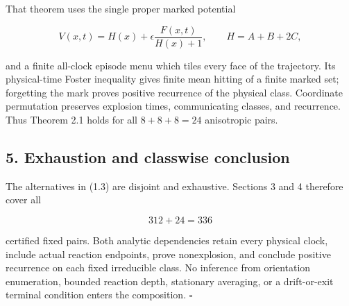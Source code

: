 That theorem uses the single proper marked potential

\[
 V(x,t)=H(x)+\epsilon\frac{F(x,t)}{H(x)+1},
 \qquad H=A+B+2C,                                     \tag{4.3}
\]

and a finite all-clock episode menu which tiles every face of the
trajectory. Its physical-time Foster inequality gives finite mean
hitting of a finite marked set; forgetting the mark proves positive
recurrence of the physical class. Coordinate permutation preserves
explosion times, communicating classes, and recurrence. Thus Theorem 2.1
holds for all \(8+8+8=24\) anisotropic pairs.

\subsection{5. Exhaustion and classwise
conclusion}

The alternatives in (1.3) are disjoint and exhaustive. Sections 3 and 4
therefore cover all

\[
                              312+24=336              \tag{5.1}
\]

certified fixed pairs. Both analytic dependencies retain every physical
clock, include actual reaction endpoints, prove nonexplosion, and
conclude positive recurrence on each fixed irreducible class. No
inference from orientation enumeration, bounded reaction depth,
stationary averaging, or a drift-or-exit terminal condition enters the
composition. \(\square\)
